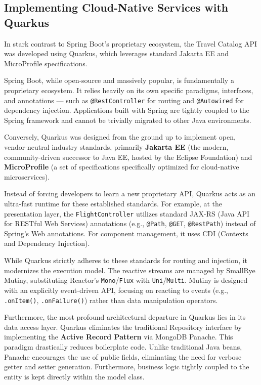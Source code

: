 \subsection{Implementing Cloud-Native Services with Quarkus}

In stark contrast to Spring Boot's proprietary ecosystem, the Travel Catalog API was developed using Quarkus, which leverages standard Jakarta EE and MicroProfile specifications. 

Spring Boot, while open-source and massively popular, is fundamentally a proprietary ecosystem. It relies heavily on its own specific paradigms, interfaces, and annotations — such as \texttt{@RestController} for routing and \texttt{@Autowired} for dependency injection. Applications built with Spring are tightly coupled to the Spring framework and cannot be trivially migrated to other Java environments.

Conversely, Quarkus was designed from the ground up to implement open, vendor-neutral industry standards, primarily \textbf{Jakarta EE} (the modern, community-driven successor to Java EE, hosted by the Eclipse Foundation) and \textbf{MicroProfile} (a set of specifications specifically optimized for cloud-native microservices). 

Instead of forcing developers to learn a new proprietary API, Quarkus acts as an ultra-fast runtime for these established standards. For example, at the presentation layer, the \texttt{FlightController} utilizes standard \gls{JAX-RS} (Java API for RESTful Web Services) annotations (e.g., \texttt{@Path}, \texttt{@GET}, \texttt{@RestPath}) instead of Spring's Web annotations. For component management, it uses \gls{CDI} (Contexts and Dependency Injection). 

While Quarkus strictly adheres to these standards for routing and injection, it modernizes the execution model. The reactive streams are managed by SmallRye Mutiny, substituting Reactor's \texttt{Mono}/\texttt{Flux} with \texttt{Uni}/\texttt{Multi}. Mutiny is designed with an explicitly event-driven API, focusing on reacting to events (e.g., \texttt{.onItem()}, \texttt{.onFailure()}) rather than data manipulation operators.

Furthermore, the most profound architectural departure in Quarkus lies in its data access layer. Quarkus eliminates the traditional Repository interface by implementing the \textbf{Active Record Pattern} via MongoDB Panache. This paradigm drastically reduces boilerplate code. Unlike traditional Java beans, Panache encourages the use of public fields, eliminating the need for verbose getter and setter generation. Furthermore, business logic tightly coupled to the entity is kept directly within the model class.

